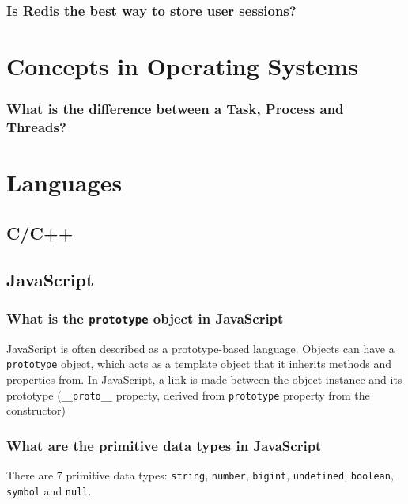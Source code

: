 \documentclass[12pt, a4paper]{article}
\newcommand{\code}[1]{\texttt{#1}}
\begin{document}
\subsubsection*{Is Redis the best way to store user sessions?}

\pagebreak
\section*{Concepts in Operating Systems}
\subsubsection*{What is the difference between a Task, Process and Threads?}


\pagebreak
\section*{Languages}

\subsection*{C/C++}


\pagebreak
\subsection*{JavaScript}
\subsubsection*{What is the \code{prototype} object in JavaScript}
JavaScript is often described as a prototype-based language.
Objects can have a \code{prototype} object, which acts as a template object that it inherits methods and properties from.
In JavaScript, a link is made between the object instance and its prototype (\code{\_\_proto\_\_} property, derived from \code{prototype} property from the constructor)

\subsubsection*{What are the primitive data types in JavaScript}
There are 7 primitive data types: \code{string}, \code{number}, \code{bigint}, \code{undefined}, \code{boolean}, \code{symbol} and \code{null}.
\end{document}
